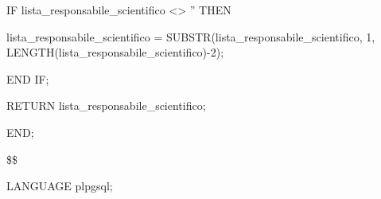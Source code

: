 \begin{flushleft}
\begin{description}
\begin{description}
                                \item IF lista\_responsabile\_scientifico <> '' THEN
                                \begin{description}
                                    \item lista\_responsabile\_scientifico = SUBSTR(lista\_responsabile\_scientifico, 1, LENGTH(lista\_responsabile\_scientifico)-2);
                                \end{description}
                                \item END IF;
                                \item RETURN lista\_responsabile\_scientifico;
                            \end{description}

                        \item END;
                        \item \$\$
                        \item LANGUAGE plpgsql;
                    \end{description}
                \end{flushleft}
            \normalfont    
    
    
    

